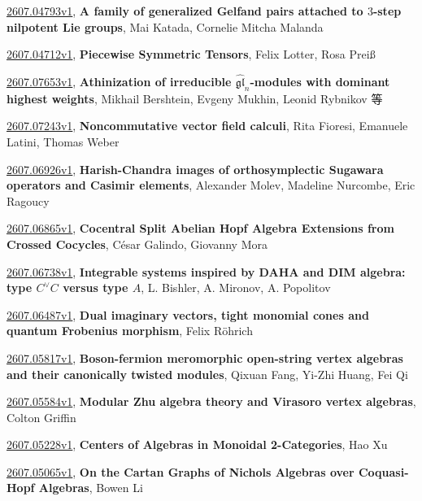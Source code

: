 \documentclass[9pt, a4paper]{article}
\theoremstyle{plain}
\theoremstyle{definition}
\theoremstyle{remark}
\newcommand{\arxiv}[3]{\href{https://arxiv.org/abs/#1}{#1}, \textbf{\textcolor{arxivblue}{#2}}, #3}
\begin{document}
\arxiv{2607.04793v1}{A family of generalized Gelfand pairs attached to $3$-step nilpotent Lie groups}{Mai Katada, Cornelie Mitcha Malanda}

\arxiv{2607.04712v1}{Piecewise Symmetric Tensors}{Felix Lotter, Rosa Preiß}

\arxiv{2607.07653v1}{Athinization of irreducible $\widehat{\mathfrak{gl}}_n$-modules with dominant highest weights}{Mikhail Bershtein, Evgeny Mukhin, Leonid Rybnikov 等}

\arxiv{2607.07243v1}{Noncommutative vector field calculi}{Rita Fioresi, Emanuele Latini, Thomas Weber}

\arxiv{2607.06926v1}{Harish-Chandra images of orthosymplectic Sugawara operators and Casimir elements}{Alexander Molev, Madeline Nurcombe, Eric Ragoucy}

\arxiv{2607.06865v1}{Cocentral Split Abelian Hopf Algebra Extensions from Crossed Cocycles}{César Galindo, Giovanny Mora}

\arxiv{2607.06738v1}{Integrable systems inspired by DAHA and DIM algebra: type $C^\vee C$ versus type $A$}{L. Bishler, A. Mironov, A. Popolitov}

\arxiv{2607.06487v1}{Dual imaginary vectors, tight monomial cones and quantum Frobenius morphism}{Felix Röhrich}

\arxiv{2607.05817v1}{Boson-fermion meromorphic open-string vertex algebras and their canonically twisted modules}{Qixuan Fang, Yi-Zhi Huang, Fei Qi}

\arxiv{2607.05584v1}{Modular Zhu algebra theory and Virasoro vertex algebras}{Colton Griffin}

\arxiv{2607.05228v1}{Centers of Algebras in Monoidal 2-Categories}{Hao Xu}

\arxiv{2607.05065v1}{On the Cartan Graphs of Nichols Algebras over Coquasi-Hopf Algebras}{Bowen Li}

\end{document}
